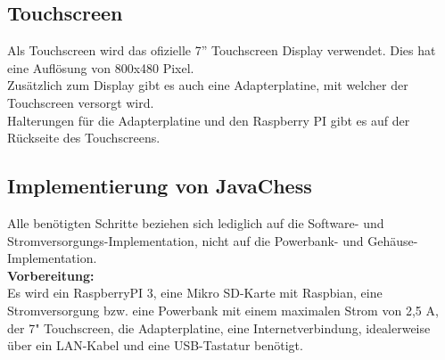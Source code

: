 \documentclass[12pt,a4paper]{article}
\begin{document}
\subsection{Touchscreen}

Als Touchscreen wird das ofizielle 7'' Touchscreen Display verwendet. Dies hat eine Auflösung von 800x480 Pixel.    \cite{RaspiScreen} \\
Zusätzlich zum Display gibt es auch eine Adapterplatine, mit welcher der Touchscreen versorgt wird. \\
Halterungen für die Adapterplatine und den Raspberry PI gibt es auf der Rückseite des Touchscreens.

\subsection{Implementierung von JavaChess}
\label{SUBSEC:IMPLEMENTJAVACHESS}

Alle benötigten Schritte beziehen sich lediglich auf die Software- und Stromversorgungs-Implementation, nicht auf die Powerbank- und Gehäuse-Implementation. \\[1ex]
\textbf{Vorbereitung:} \\[2ex]
Es wird ein RaspberryPI 3, eine Mikro SD-Karte mit Raspbian, eine Stromversorgung bzw. eine Powerbank mit einem maximalen Strom von 2,5 A, der 7" Touchscreen, die Adapterplatine, eine Internetverbindung, idealerweise über ein LAN-Kabel und eine USB-Tastatur benötigt. \\
\end{document}
